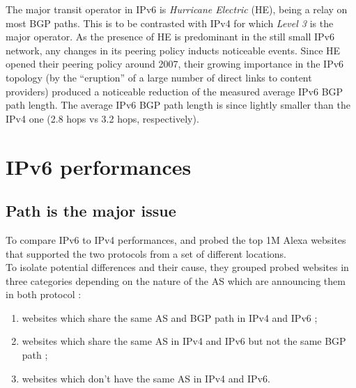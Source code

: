 \documentclass[journal]{IEEEtran}
\begin{document}
The major transit operator in IPv6 is \textit{Hurricane Electric} (HE), being a
relay on most BGP paths. This is to be contrasted with IPv4 for which
\textit{Level 3} is the major operator. As the presence of HE is predominant in
the still small IPv6 network, any changes in its peering policy inducts
noticeable events. Since HE opened their peering policy around
2007\cite{he:peering}, their growing importance in the IPv6 topology (by the
\enquote{eruption} of a large number of direct links to content providers)
produced a noticeable reduction of the measured average IPv6 BGP path length.
The average IPv6 BGP path length is since lightly smaller than the IPv4 one
(2.8 hops vs 3.2 hops, respectively).


\section{IPv6 performances}
\label{performances}

\subsection{Path is the major issue}
\label{path_issue}

To compare IPv6 to IPv4 performances, \cite{paper3} and \cite{paper4} probed the
top 1M Alexa websites that supported the two protocols from a set of different
locations. \\
To isolate potential differences and their cause, they grouped probed websites
in three categories depending on the nature of the
AS which are announcing them in both protocol :

\begin{enumerate}
    \item websites which share the same AS and BGP path in IPv4 and IPv6 ;
    \label{SP}
    \item websites which share the same AS in IPv4 and IPv6 but not the same
    BGP path ;
    \label{DP}
    \item websites which don't have the same AS in IPv4 and IPv6.
    \label{DL}
\end{enumerate}
\end{document}

